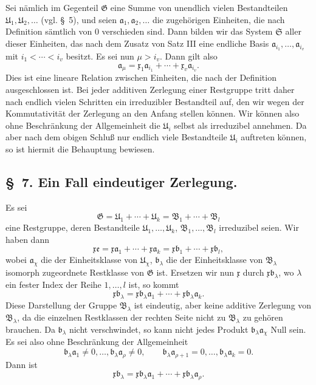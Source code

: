 \documentclass[11pt]{article}
\newcommand{\mG}{\mathfrak{G}}
\newcommand{\mB}{\mathfrak{B}}
\newcommand{\ma}{\mathfrak{a}}
\newcommand{\mb}{\mathfrak{b}}
\newcommand{\mx}{\mathfrak{x}}
\newcommand{\me}{\mathfrak{e}}
\newcommand{\mU}{\mathfrak{U}}
\newcommand{\mS}{\mathfrak{S}}
\begin{document}
Sei nämlich im Gegenteil $\mG$ eine Summe von unendlich vielen Bestandteilen $\mU_1,\mU_2,\ldots$ (vgl. \S~5), und seien $\ma_1,\ma_2,\ldots$ die zugehörigen Einheiten, die nach Definition sämtlich von $0$ verschieden sind. Dann bilden wir das System $\mS$ aller dieser Einheiten, das nach dem Zusatz von Satz III eine endliche Basis $\ma_{i_1},\ldots,\ma_{i_v}$ mit $i_1<\cdots<i_v$ besitzt. Es sei nun $\mu>i_v$. Dann gilt also
\[
 \ma_\mu=\mx_1\ma_{i_1}+\cdots+\mx_v\ma_{i_v}.
\]
Dies ist eine lineare Relation zwischen Einheiten, die nach der Definition ausgeschlossen ist. Bei jeder additiven Zerlegung einer Restgruppe tritt daher nach endlich vielen Schritten ein irreduzibler Bestandteil auf, den wir wegen der Kommutativität der Zerlegung an den Anfang stellen können. Wir können also ohne Beschränkung der Allgemeinheit die $\mU_i$ selbst als irreduzibel annehmen. Da aber nach dem obigen Schluß nur endlich viele Bestandteile $\mU_i$ auftreten können, so ist hiermit die Behauptung bewiesen.

\subsection*{\S~7. Ein Fall eindeutiger Zerlegung.}

Es sei
\[
 \mG=\mU_1+\cdots+\mU_k=\mB_1+\cdots+\mB_l
\]
eine Restgruppe, deren Bestandteile $\mU_1,\ldots,\mU_k$, $\mB_1,\ldots,\mB_l$ irreduzibel seien. Wir haben dann
\begin{equation}
 \mx\me=\mx\ma_1+\cdots+\mx\ma_k
 =\mx\mb_1+\cdots+\mx\mb_l,
\tag{22}
\end{equation}
wobei $\ma_\chi$ die der Einheitsklasse von $\mU_\chi$, $\mb_\lambda$ die der Einheitsklasse von $\mB_\lambda$ isomorph zugeordnete Restklasse von $\mG$ ist. Ersetzen wir nun $\mx$ durch $\mx\mb_\lambda$, wo $\lambda$ ein fester Index der Reihe $1,\ldots,l$ ist, so kommt
\begin{equation}
 \mx\mb_\lambda=\mx\mb_\lambda\ma_1+\cdots+\mx\mb_\lambda\ma_k.
\tag{23}
\end{equation}
Diese Darstellung der Gruppe $\mB_\lambda$ ist eindeutig, aber keine additive Zerlegung von $\mB_\lambda$, da die einzelnen Restklassen der rechten Seite nicht zu $\mB_\lambda$ zu gehören brauchen. Da $\mb_\lambda$ nicht verschwindet, so kann nicht jedes Produkt $\mb_\lambda\ma_\chi$ Null sein. Es sei also ohne Beschränkung der Allgemeinheit
\[
 \mb_\lambda\ma_1\ne0,
 \ldots,
 \mb_\lambda\ma_\rho\ne0,
 \qquad
 \mb_\lambda\ma_{\rho+1}=0,
 \ldots,
 \mb_\lambda\ma_k=0.
\]
Dann ist
\[
 \mx\mb_\lambda=\mx\mb_\lambda\ma_1+\cdots+\mx\mb_\lambda\ma_\rho.
\]
\end{document}
